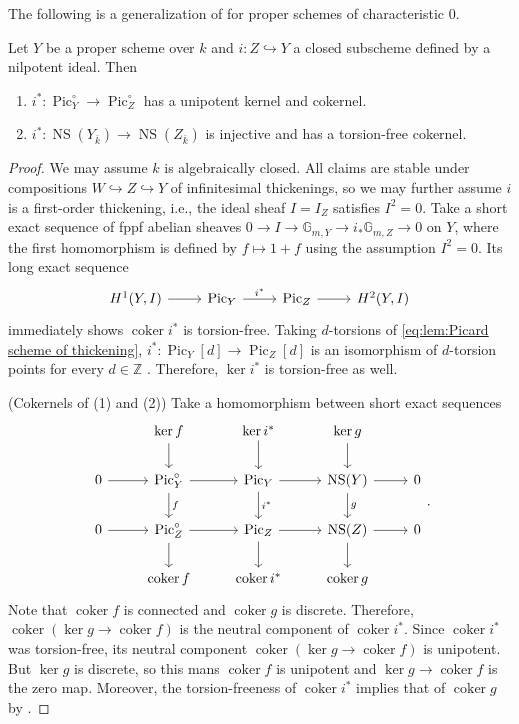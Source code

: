 \documentclass[reqno, letterpaper]{amsart}
\numberwithin{equation}{subsection}
\let\to\longrightarrow
\let\mapsto\longmapsto
\newcommand{\GG}{\mathbb{G}}
\newcommand{\ZZ}{\mathbb{Z}}
\DeclareMathOperator{\coker}{coker}
\DeclareMathOperator{\Pic}{Pic}
\DeclareMathOperator{\NS}{NS}
\begin{document}
			The following is a generalization of \cite[Tag~0C6S]{stacks-project} for proper schemes of characteristic $0$.
			
			\begin{lemma} \label{lem:Picard scheme of thickening}
				Let $Y$ be a proper scheme over $k$ and $i : Z \hookrightarrow Y$ a closed subscheme defined by a nilpotent ideal. Then
				\begin{enumerate}
					\item $i^* : \Pic^\circ_Y \to \Pic^\circ_Z$ has a unipotent kernel and cokernel.
					\item $i^* : \NS(Y_{\bar k}) \to \NS(Z_{\bar k})$ is injective and has a torsion-free cokernel.
				\end{enumerate}
			\end{lemma}
			\begin{proof}
				We may assume $k$ is algebraically closed. All claims are stable under compositions $W \hookrightarrow Z \hookrightarrow Y$ of infinitesimal thickenings, so we may further assume $i$ is a first-order thickening, i.e., the ideal sheaf $I = I_Z$ satisfies $I^2 = 0$. Take a short exact sequence of fppf abelian sheaves $0 \to I \to \GG_{m, Y} \to i_* \GG_{m, Z} \to 0$ on $Y$, where the first homomorphism is defined by $f \mapsto 1 + f$ using the assumption $I^2 = 0$. Its long exact sequence
				\begin{equation} \label{eq:lem:Picard scheme of thickening}
					\begin{tikzcd}
						H^1 (Y, I) \arrow[r] & \Pic_Y \arrow[r, "i^*"] & \Pic_Z \arrow[r] & H^2 (Y, I)
					\end{tikzcd}
				\end{equation}
				immediately shows $\coker i^*$ is torsion-free. Taking $d$-torsions of \eqref{eq:lem:Picard scheme of thickening}, $i^* : \Pic_Y[d] \to \Pic_Z[d]$ is an isomorphism of $d$-torsion points for every $d \in \ZZ$ \cite[Tag~0C6S]{stacks-project}. Therefore, $\ker i^*$ is torsion-free as well.
				
				\medskip
				
				(Cokernels of (1) and (2)) Take a homomorphism between short exact sequences
				\[\begin{tikzcd}
					& \ker f \arrow[d] & \ker i^* \arrow[d] & \ker g \arrow[d] \\
					0 \arrow[r] & \Pic^\circ_Y \arrow[r] \arrow[d, "f"] & \Pic_Y \arrow[r] \arrow[d, "i^*"] & \NS(Y) \arrow[r] \arrow[d, "g"] & 0 \\
					0 \arrow[r] & \Pic^\circ_Z \arrow[r] \arrow[d] & \Pic_Z \arrow[r] \arrow[d] & \NS(Z) \arrow[r] \arrow[d] & 0 \\
					& \coker f & \coker i^* & \coker g
				\end{tikzcd}.\]
				Note that $\coker f$ is connected and $\coker g$ is discrete. Therefore, $\coker (\ker g \to \coker f)$ is the neutral component of $\coker i^*$. Since $\coker i^*$ was torsion-free, its neutral component $\coker (\ker g \to \coker f)$ is unipotent. But $\ker g$ is discrete, so this mans $\coker f$ is unipotent and $\ker g \to \coker f$ is the zero map. Moreover, the torsion-freeness of $\coker i^*$ implies that of $\coker g$ by .
				

\end{proof}
\end{document}

